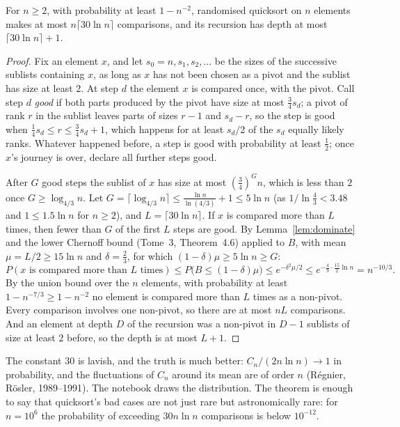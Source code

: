 \begin{theorem}\label{thm:qsconc}
For $n\ge2$, with probability at least $1-n^{-2}$, randomised quicksort on $n$ elements makes at most $n\lceil30\ln n\rceil$ comparisons, and its recursion
has depth at most $\lceil30\ln n\rceil+1$.
\end{theorem}
\begin{proof}
Fix an element $x$, and let $s_0=n,s_1,s_2,\dots$ be the sizes of the successive sublists containing $x$, as long as $x$ has not been chosen as a
pivot and the sublist has size at least $2$. At step $d$ the element $x$ is compared once, with the pivot. Call step $d$ \emph{good} if both parts
produced by the pivot have size at most $\frac34s_d$; a pivot of rank $r$ in the sublist leaves parts of sizes $r-1$ and $s_d-r$, so the step is good
when $\frac14s_d\le r\le\frac34s_d+1$, which happens for at least $s_d/2$ of the $s_d$ equally likely ranks. Whatever happened before, a step is good with
probability at least $\frac12$; once $x$'s journey is over, declare all further steps good.

After $G$ good steps the sublist of $x$ has size at most $(\frac34)^Gn$, which is less than $2$ once $G\ge\log_{4/3}n$. Let $G=\lceil\log_{4/3}n\rceil\le\frac{\ln n}{\ln(4/3)}+1\le5\ln n$
(as $1/\ln\frac43<3.48$ and $1\le1.5\ln n$ for $n\ge2$), and $L=\lceil30\ln n\rceil$. If $x$ is compared more than $L$ times, then fewer than $G$ of the first $L$ steps are
good. By Lemma~\ref{lem:dominate} and the lower Chernoff bound (Tome~3, Theorem~4.6) applied to $B$, with mean $\mu=L/2\ge15\ln n$ and $\delta=\frac23$, for which $(1-\delta)\mu\ge5\ln n\ge G$:
\[
P(\text{$x$ is compared more than $L$ times})\le P\bigl(B\le(1-\delta)\mu\bigr)\le e^{-\delta^2\mu/2}\le e^{-\frac49\cdot\frac{15}2\ln n}=n^{-10/3}.
\]
By the union bound over the $n$ elements, with probability at least $1-n^{-7/3}\ge1-n^{-2}$ no element is compared more than $L$ times as a non-pivot.
Every comparison involves one non-pivot, so there are at most $nL$ comparisons. And an element at depth $D$ of the recursion was a non-pivot in
$D-1$ sublists of size at least $2$ before, so the depth is at most $L+1$.
\end{proof}

The constant $30$ is lavish, and the truth is much better: $C_n/(2n\ln n)\to1$ in probability, and the fluctuations of $C_n$ around its mean are of
order $n$ (R\'egnier, R\"osler, 1989--1991). The notebook draws the distribution. The theorem is enough to say that quicksort's bad cases are not just
rare but astronomically rare: for $n=10^6$ the probability of exceeding $30n\ln n$ comparisons is below $10^{-12}$.

